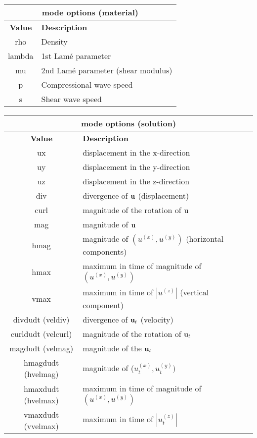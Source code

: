 \documentclass[11pt]{report}
\newcommand{\ub}{{\bf u}}
\begin{document}
\begin{center}
\begin{tabular}{|c|l|} \hline
\multicolumn{2}{|c|}{\bf mode options (material)}\\ \hline
\bf{Value} & \bf{Description} \\ 
\hline  \hline
rho     & Density \\ \hline
lambda  & 1st Lam\'e parameter \\ \hline
mu      & 2nd Lam\'e parameter (shear modulus) \\ \hline
p       & Compressional wave speed \\ \hline
s       & Shear wave speed \\ \hline
\end{tabular}
\end{center}
\begin{center}
\begin{tabular}{|c|l|} \hline
\multicolumn{2}{|c|}{\bf mode options (solution)}\\ \hline
\bf{Value} & \bf{Description} \\ 
\hline  \hline
ux      & displacement in the x-direction \\ \hline
uy      & displacement in the y-direction \\ \hline
uz      & displacement in the z-direction \\ \hline\hline
div     & divergence of $\ub$ (displacement) \\ \hline
curl    & magnitude of the rotation of $\ub$ \\ \hline 
mag     & magnitude of $\ub$ \\ \hline
hmag    & magnitude of $(u^{(x)}, u^{(y)})$ (horizontal components) \\ \hline
hmax & maximum in time of magnitude of $(u^{(x)}, u^{(y)})$ \\ \hline
vmax & maximum in time of $|u^{(z)}|$ (vertical component) \\ \hline\hline
%
divdudt (veldiv) & divergence of $\ub_t$ (velocity)\\ \hline
curldudt (velcurl) & magnitude of the rotation of $\ub_t$ \\ \hline
magdudt (velmag) & magnitude of the $\ub_t$ \\ \hline
hmagdudt (hvelmag)& magnitude of ($u^{(x)}_t, u^{(y)}_t)$ \\ \hline
hmaxdudt (hvelmax) & maximum in time of magnitude of $(u^{(x)}, u^{(y)})$ \\ \hline
vmaxdudt (vvelmax) & maximum in time of $|u^{(z)}_t|$    \\ \hline
\end{tabular}
\end{center}
\end{document}
